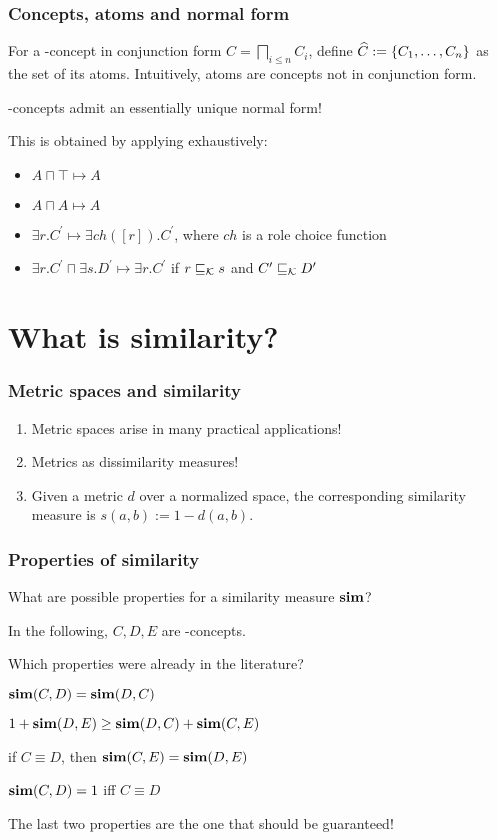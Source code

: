 \documentclass{beamer}
\begin{document}
\begin{frame}
  \frametitle{Concepts, atoms and normal form}
  For a \elh-concept in conjunction form
  \(C = \bigsqcap_{i \le n} C_i\), define
  \(
    \widehat{C} := \lbrace C_1,\dotsc,C_n \rbrace
  \)
  as the set of its \alert{atoms}.
  Intuitively, atoms are concepts not in
  conjunction form.

  \elh-concepts admit an essentially unique \alert{normal form}!

  This is obtained by applying exhaustively:
  \begin{itemize}[<+->]
    \item \(A \sqcap \top \mapsto A\)
    \item \(A \sqcap A \mapsto A\)
    \item \(\exists{}r.C^\prime \mapsto%
           \exists{}ch([r]).C^\prime\),
           where \(ch\) is a role choice function
    \item \(\exists{}r.C^\prime \sqcap%
           \exists{}s.D^\prime \mapsto%
          \exists{}r.C^\prime\) if
          \(r\sqsubseteq_{\mathcal{K}}s\) and
          \(C^\prime \sqsubseteq_{\mathcal{K}} D^\prime\)
  \end{itemize}
\end{frame}


\section{What is similarity?}

\begin{frame}
  \frametitle{Metric spaces and similarity}
  \begin{enumerate}
    \item Metric spaces arise in many practical
    applications!
    \item Metrics as \alert{dissimilarity} measures!
    \item Given a metric \(d\) over a normalized space,
    the corresponding \alert{similarity} measure is
    \(
      s(a,b) := 1 - d(a,b)
    \).
  \end{enumerate}  
\end{frame}

\begin{frame}
  \frametitle{Properties of similarity}
  What are possible properties for a
  \alert{similarity measure} \(\operatorname{\mathbf{sim}}\)?

  In the following, \(C,D,E\) are \elh-concepts.

  Which properties were already in the literature?

  \begin{description}[<+->]
    \item[Symmetric] \(\operatorname{\mathbf{sim}}(C,D) = \operatorname{\mathbf{sim}}(D,C)\)
    \item[Triangle inequality]
      \(1 + \operatorname{\mathbf{sim}}(D,E) \ge \operatorname{\mathbf{sim}}(D,C) + \operatorname{\mathbf{sim}}(C,E)\)
    \item[Equivalence invariant]
      if \(C \equiv D\), then
      \(\operatorname{\mathbf{sim}}(C,E) = \operatorname{\mathbf{sim}}(D,E)\)
    \item[Equivalence closed]
      \(\operatorname{\mathbf{sim}}(C,D) = 1\) iff \(C \equiv D\)
  \end{description}
  The last two properties are the one that should
  be guaranteed!
\end{frame}
\end{document}
